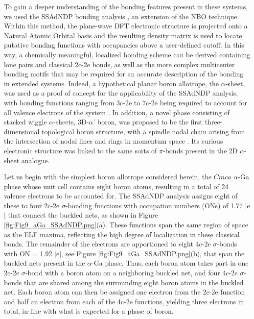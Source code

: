 \documentclass[reprint,aps,prl,twocolumn,letterpaper]{revtex4-2}
\begin{document}
To gain a deeper understanding of the bonding features present in these systems, we used the SSAdNDP bonding analysis \cite{Galeev:2013}, an extension of the NBO technique. Within this method, the plane-wave DFT electronic structure is projected onto a Natural Atomic Orbital basis and the resulting density matrix is used to locate putative bonding functions with occupancies above a user-defined cutoff. In this way, a chemically meaningful, localized bonding scheme can be derived containing lone pairs and classical 2c-2e bonds, as well as the more complex multicenter bonding motifs that may be required for an accurate description of the bonding in extended systems. Indeed, a hypothetical planar boron allotrope, the $\alpha$-sheet, was used as a proof of concept for the applicability of the SSAdNDP analysis, with bonding functions ranging from 3c-2e to 7c-2e being required to account for all valence electrons of the system \cite{Galeev:2013}. In addition, a novel phase consisting of stacked wiggle $\alpha$-sheets, 3D-$\alpha$' boron, was proposed to be the first three-dimensional topological boron structure, with a spindle nodal chain arising from the intersection of nodal lines and rings in momentum space \cite{Gao:2018}. Its curious electronic structure was linked to the same sorts of $\pi$-bonds present in the 2D $\alpha$-sheet analogue. 

Let us begin with the simplest boron allotrope considered herein, the $Cmca$ $\alpha$-Ga phase whose unit cell contains eight boron atoms, resulting in a total of 24 valence electrons to be accounted for. The SSAdNDP analysis assigns eight of these to four 2c-2e $\sigma$-bonding functions with occupation numbers (ONs) of 1.77 $\vert$e$\vert$ that connect the buckled nets, as shown in Figure \ref{fig:Fig9_aGa_SSAdNDP.png}(a). These functions span the same region of space as the ELF maxima, reflecting the high degree of localization in these classical bonds. The remainder of the electrons are apportioned to eight 4c-2e $\sigma$-bonds with ON = 1.92 $\vert$e$\vert$, see Figure \ref{fig:Fig9_aGa_SSAdNDP.png}(b), that span the buckled nets present in the $\alpha$-Ga phase. Thus, each boron atom takes part in one 2c-2e $\sigma$-bond with a boron atom on a neighboring buckled net, and four 4c-2e $\sigma$-bonds that are shared among the surrounding eight boron atoms in the buckled net. Each boron atom can then be assigned one electron from the 2c-2e function and half an electron from each of the 4c-2e functions, yielding three electrons in total, in-line with what is expected for a phase of boron.
\end{document}
